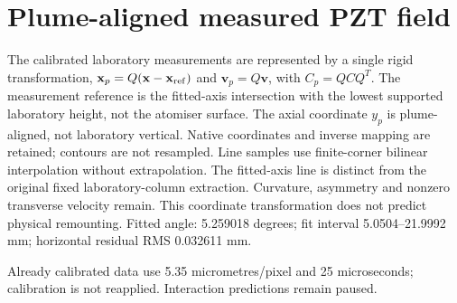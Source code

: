 \section{Plume-aligned measured PZT field}
The calibrated laboratory measurements are represented by a single rigid transformation,
$\mathbf{x}_p=Q(\mathbf{x}-\mathbf{x}_{\rm ref})$ and $\mathbf{v}_p=Q\mathbf{v}$,
with $C_p=QCQ^T$. The measurement reference is the fitted-axis intersection with
the lowest supported laboratory height, not the atomiser surface. The axial coordinate
$y_p$ is plume-aligned, not laboratory vertical. Native coordinates and inverse mapping
are retained; contours are not resampled. Line samples use finite-corner bilinear
interpolation without extrapolation. The fitted-axis line is distinct from the original
fixed laboratory-column extraction. Curvature, asymmetry and nonzero transverse velocity
remain. This coordinate transformation does not predict physical remounting.
Fitted angle: 5.259018 degrees; fit interval 5.0504--21.9992 mm; horizontal residual RMS 0.032611 mm.

Already calibrated data use 5.35 micrometres/pixel and 25 microseconds; calibration is not reapplied. Interaction predictions remain paused.
